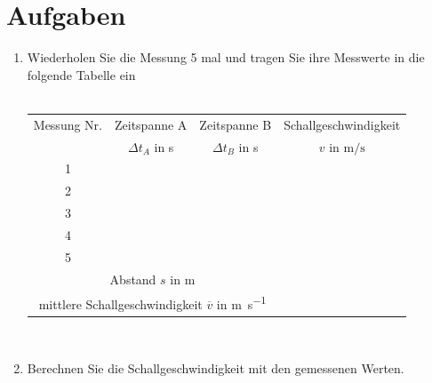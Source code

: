 \documentclass[12pt,oneside]{scrartcl}
\begin{document}
\section*{Aufgaben}
\begin{enumerate}
\item Wiederholen Sie die Messung 5 mal und tragen Sie ihre Messwerte in die folgende Tabelle ein\\\\
\vspace{0,5cm}
\begin{large}
\begin{tabular}{|c|c|c|c|}
\hline
Messung Nr. & Zeitspanne A  & Zeitspanne B & Schallgeschwindigkeit \\
 & $\Delta t_{A}$ in s &  $\Delta t_{B}$ in s & $v$ in $\si{\meter\per\second}$ \\ 
\hline 
1 &  &  & \\ 
\hline 
2 &  &  & \\ 
\hline 
3 &  &  & \\ 
\hline 
4 &  &  & \\ 
\hline 
5 &  &  & \\ 
\hline 
\hline
\multicolumn{3}{|c|}{Abstand $s$ in $\si{\meter}$} &  \\
\hline
\multicolumn{3}{|c|}{mittlere Schallgeschwindigkeit $\overline{v}$ in \si{\meter\per\second}} & \\
\hline
\end{tabular}\label{tab}\end{large} \\
\item Berechnen Sie die Schallgeschwindigkeit mit den gemessenen Werten.
\end{enumerate}
\end{document}
